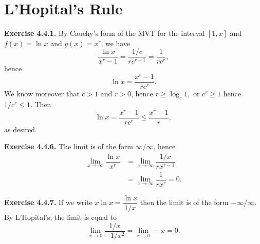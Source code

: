 \documentclass[12pt]{book}
\newenvironment{exercise}[2][Exercise]{\begin{trivlist}
\item[\hskip \labelsep {\bfseries #1}\hskip \labelsep {\bfseries #2.}]}{\end{trivlist}}
\newcommand{\prb}[1]{\textbf{Exercise #1.}}
\begin{document}
\begin{exercise}{1.4.6}
\begin{exercise}{4.3.14}
\end{exercise}

\begin{exercise}{4.3.15}
\end{exercise}

\begin{exercise}{4.3.16}
\end{exercise}

\section{L'Hopital's Rule}


\prb{4.4.1} By Cauchy's form of the MVT for the interval $[1, x]$ and $f(x) = \ln x$ and $g(x) = x^r$, we have $$\dfrac{\ln x}{x^r - 1} = \dfrac{1/c}{rc^{r-1}} = \dfrac{1}{rc^r},$$ hence $$\ln x = \dfrac{x^r - 1}{rc^r}.$$ We know moreover that $c > 1$ and $r > 0$, hence $r \geq \log_c 1,$ or $c^r \geq 1$ hence $1/c^r \leq 1.$ Then $$\ln x = \dfrac{x^r - 1}{rc^r} \leq \dfrac{x^r-1}{r},$$ as desired.


\begin{exercise}{4.4.2}
\end{exercise}



\begin{exercise}{4.4.3}
\end{exercise}



\begin{exercise}{4.4.4}
\end{exercise}




\begin{exercise}{4.4.5}
\end{exercise}



\prb{4.4.6} The limit is of the form $\infty/\infty$, hence \begin{align*}
\lim_{x \rightarrow \infty} \dfrac{\ln x}{x^r} & = \lim_{x \rightarrow \infty} \dfrac{1/x}{rx^{r-1}} \\
& = \lim_{x \rightarrow \infty} \dfrac{1}{rx^{r}} = 0. \end{align*}

\prb{4.4.7} If we write $x \ln x = \dfrac{\ln x}{1/x}$ then the limit is of the form $-\infty/\infty$. By L'Hopital's, the limit is equal to $$\lim_{x \rightarrow 0} \dfrac{1/x}{-1/x^2} = \lim_{x \rightarrow 0} -x = 0.$$


\end{exercise}
\end{document}
